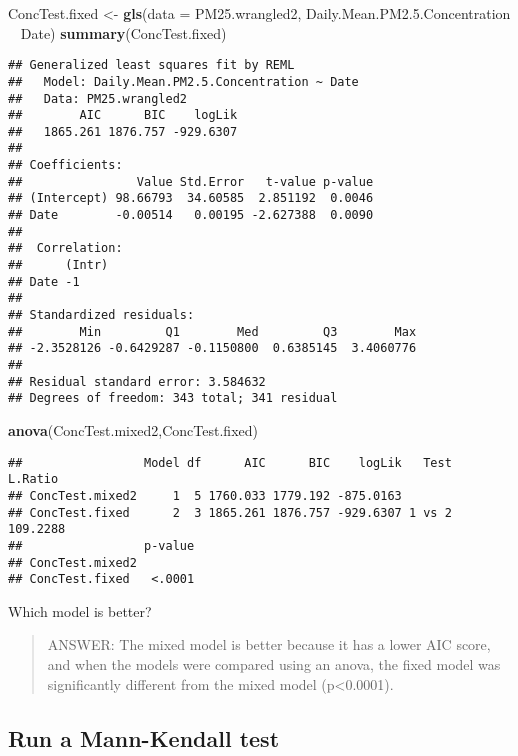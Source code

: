 \documentclass[]{article}
\newenvironment{Shaded}{\begin{snugshade}}{\end{snugshade}}
\newcommand{\KeywordTok}[1]{\textcolor[rgb]{0.13,0.29,0.53}{\textbf{#1}}}
\newcommand{\DataTypeTok}[1]{\textcolor[rgb]{0.13,0.29,0.53}{#1}}
\newcommand{\FloatTok}[1]{\textcolor[rgb]{0.00,0.00,0.81}{#1}}
\newcommand{\StringTok}[1]{\textcolor[rgb]{0.31,0.60,0.02}{#1}}
\newcommand{\OperatorTok}[1]{\textcolor[rgb]{0.81,0.36,0.00}{\textbf{#1}}}
\newcommand{\NormalTok}[1]{#1}
\begin{document}
\begin{Shaded}
\begin{Highlighting}[]
\NormalTok{ConcTest.fixed <-}\StringTok{ }\KeywordTok{gls}\NormalTok{(}\DataTypeTok{data =}\NormalTok{ PM25.wrangled2,}
\NormalTok{                      Daily.Mean.PM2.}\FloatTok{5.}\NormalTok{Concentration }\OperatorTok{~}\StringTok{ }\NormalTok{Date)}
\KeywordTok{summary}\NormalTok{(ConcTest.fixed)}
\end{Highlighting}
\end{Shaded}

\begin{verbatim}
## Generalized least squares fit by REML
##   Model: Daily.Mean.PM2.5.Concentration ~ Date 
##   Data: PM25.wrangled2 
##        AIC      BIC    logLik
##   1865.261 1876.757 -929.6307
## 
## Coefficients:
##                Value Std.Error   t-value p-value
## (Intercept) 98.66793  34.60585  2.851192  0.0046
## Date        -0.00514   0.00195 -2.627388  0.0090
## 
##  Correlation: 
##      (Intr)
## Date -1    
## 
## Standardized residuals:
##        Min         Q1        Med         Q3        Max 
## -2.3528126 -0.6429287 -0.1150800  0.6385145  3.4060776 
## 
## Residual standard error: 3.584632 
## Degrees of freedom: 343 total; 341 residual
\end{verbatim}

\begin{Shaded}
\begin{Highlighting}[]
\KeywordTok{anova}\NormalTok{(ConcTest.mixed2,ConcTest.fixed)}
\end{Highlighting}
\end{Shaded}

\begin{verbatim}
##                 Model df      AIC      BIC    logLik   Test  L.Ratio
## ConcTest.mixed2     1  5 1760.033 1779.192 -875.0163                
## ConcTest.fixed      2  3 1865.261 1876.757 -929.6307 1 vs 2 109.2288
##                 p-value
## ConcTest.mixed2        
## ConcTest.fixed   <.0001
\end{verbatim}

Which model is better?

\begin{quote}
ANSWER: The mixed model is better because it has a lower AIC score, and
when the models were compared using an anova, the fixed model was
significantly different from the mixed model (p\textless{}0.0001).
\end{quote}

\subsection{Run a Mann-Kendall test}\label{run-a-mann-kendall-test}
\end{document}
